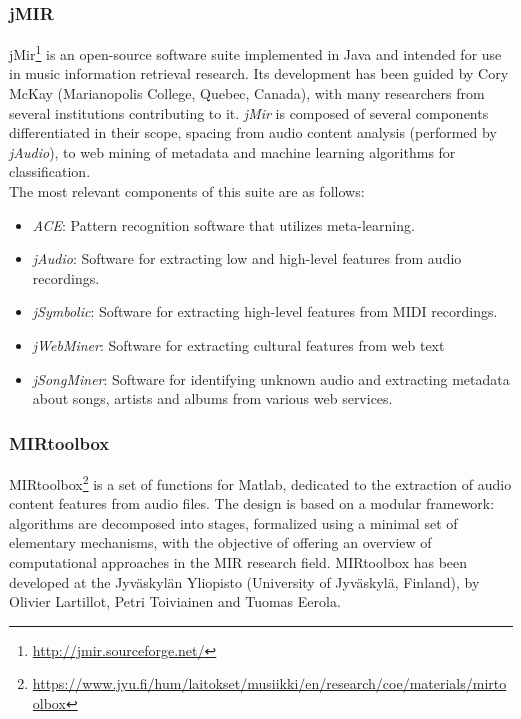 \subsubsection*{jMIR}
jMir\footnote{\url{http://jmir.sourceforge.net/}} is an open-source software suite implemented in Java and intended for use in music information retrieval research. Its development has been guided by Cory McKay (Marianopolis College, Quebec, Canada), with many researchers from several institutions contributing to it. \textit{jMir} is composed of several components differentiated in their scope, spacing from audio content analysis (performed by \textit{jAudio}), to web mining of metadata and machine learning algorithms for classification. \\ The most relevant components of this suite are as follows:
\begin{itemize}
\item \textit{ACE}: Pattern recognition software that utilizes meta-learning. 
\item \textit{jAudio}: Software for extracting low and high-level features from audio recordings.
\item \textit{jSymbolic}: Software for extracting high-level features from MIDI recordings.
\item \textit{jWebMiner}: Software for extracting cultural features from web text
\item \textit{jSongMiner}: Software for identifying unknown audio and extracting metadata about songs, artists and albums from various web services.
\end{itemize}


\subsubsection*{MIRtoolbox}
MIRtoolbox\footnote{\url{https://www.jyu.fi/hum/laitokset/musiikki/en/research/coe/materials/mirtoolbox}} is a set of functions for Matlab, dedicated to the extraction of audio content features from audio files. The design is based on a modular framework: algorithms are decomposed into stages, formalized using a minimal set of elementary mechanisms, with the objective of offering an overview of computational approaches in the MIR research field. MIRtoolbox has been developed at the Jyväskylän Yliopisto (University of Jyväskylä, Finland), by Olivier Lartillot, Petri Toiviainen and Tuomas Eerola.


